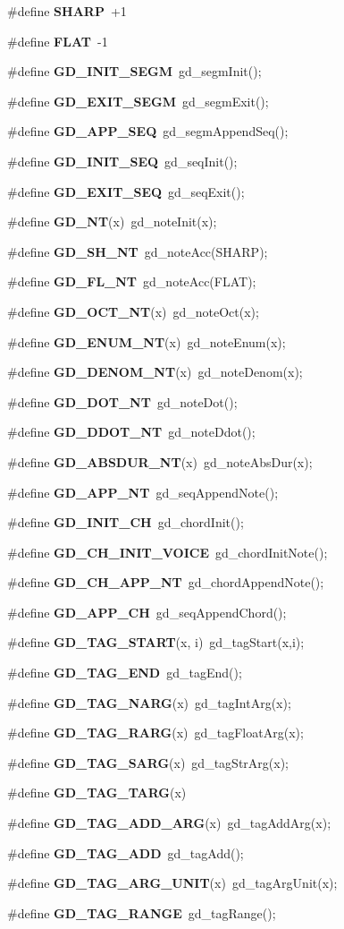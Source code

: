 \begin{CompactItemize}
\item 
\#define {\bf SHARP}\ +1
\item 
\#define {\bf FLAT}\ -1
\item 
\#define {\bf GD\_\-INIT\_\-SEGM}\ gd\_\-segm\-Init();
\item 
\#define {\bf GD\_\-EXIT\_\-SEGM}\ gd\_\-segm\-Exit();
\item 
\#define {\bf GD\_\-APP\_\-SEQ}\ gd\_\-segm\-Append\-Seq();
\item 
\#define {\bf GD\_\-INIT\_\-SEQ}\ gd\_\-seq\-Init();
\item 
\#define {\bf GD\_\-EXIT\_\-SEQ}\ gd\_\-seq\-Exit();
\item 
\#define {\bf GD\_\-NT}(x)\ gd\_\-note\-Init(x);
\item 
\#define {\bf GD\_\-SH\_\-NT}\ gd\_\-note\-Acc(SHARP);
\item 
\#define {\bf GD\_\-FL\_\-NT}\ gd\_\-note\-Acc(FLAT);
\item 
\#define {\bf GD\_\-OCT\_\-NT}(x)\ gd\_\-note\-Oct(x);
\item 
\#define {\bf GD\_\-ENUM\_\-NT}(x)\ gd\_\-note\-Enum(x);
\item 
\#define {\bf GD\_\-DENOM\_\-NT}(x)\ gd\_\-note\-Denom(x);
\item 
\#define {\bf GD\_\-DOT\_\-NT}\ gd\_\-note\-Dot();
\item 
\#define {\bf GD\_\-DDOT\_\-NT}\ gd\_\-note\-Ddot();
\item 
\#define {\bf GD\_\-ABSDUR\_\-NT}(x)\ gd\_\-note\-Abs\-Dur(x);
\item 
\#define {\bf GD\_\-APP\_\-NT}\ gd\_\-seq\-Append\-Note();
\item 
\#define {\bf GD\_\-INIT\_\-CH}\ gd\_\-chord\-Init();
\item 
\#define {\bf GD\_\-CH\_\-INIT\_\-VOICE}\ gd\_\-chord\-Init\-Note();
\item 
\#define {\bf GD\_\-CH\_\-APP\_\-NT}\ gd\_\-chord\-Append\-Note();
\item 
\#define {\bf GD\_\-APP\_\-CH}\ gd\_\-seq\-Append\-Chord();
\item 
\#define {\bf GD\_\-TAG\_\-START}(x, i)\ gd\_\-tag\-Start(x,i);
\item 
\#define {\bf GD\_\-TAG\_\-END}\ gd\_\-tag\-End();
\item 
\#define {\bf GD\_\-TAG\_\-NARG}(x)\ gd\_\-tag\-Int\-Arg(x);
\item 
\#define {\bf GD\_\-TAG\_\-RARG}(x)\ gd\_\-tag\-Float\-Arg(x);
\item 
\#define {\bf GD\_\-TAG\_\-SARG}(x)\ gd\_\-tag\-Str\-Arg(x);
\item 
\#define {\bf GD\_\-TAG\_\-TARG}(x)
\item 
\#define {\bf GD\_\-TAG\_\-ADD\_\-ARG}(x)\ gd\_\-tag\-Add\-Arg(x);
\item 
\#define {\bf GD\_\-TAG\_\-ADD}\ gd\_\-tag\-Add();
\item 
\#define {\bf GD\_\-TAG\_\-ARG\_\-UNIT}(x)\ gd\_\-tag\-Arg\-Unit(x);
\item 
\#define {\bf GD\_\-TAG\_\-RANGE}\ gd\_\-tag\-Range();
\end{CompactItemize}
